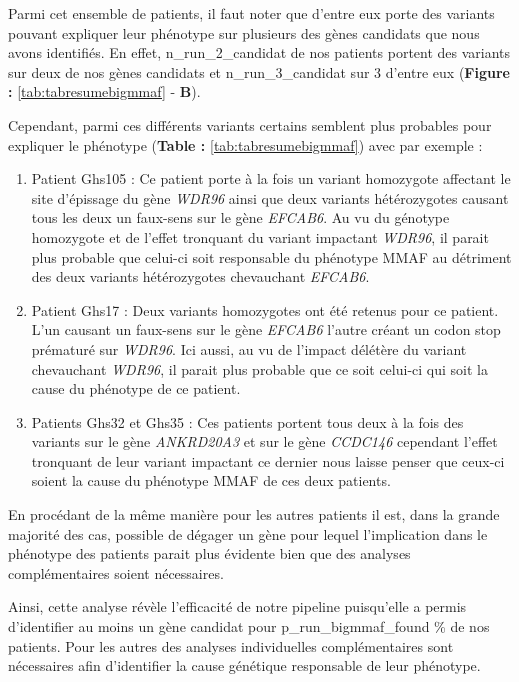 \documentclass[12pt,twoside]{reedthesis}
\providecommand{\tightlist}{%
  \setlength{\itemsep}{0pt}\setlength{\parskip}{0pt}}
\theoremstyle{definition}
\theoremstyle{definition}
\theoremstyle{remark}
\begin{document}
  Parmi cet ensemble de patients, il faut noter que d'entre eux porte des
  variants pouvant expliquer leur phénotype sur plusieurs des gènes
  candidats que nous avons identifiés. En effet, n\_run\_2\_candidat de
  nos patients portent des variants sur deux de nos gènes candidats et
  n\_run\_3\_candidat sur 3 d'entre eux (\textbf{Figure :
  }\ref{tab:tabresumebigmmaf} - \textbf{B}).
  
  Cependant, parmi ces différents variants certains semblent plus
  probables pour expliquer le phénotype (\textbf{Table :
  }\ref{tab:tabresumebigmmaf}) avec par exemple :
  
  \begin{enumerate}
  \def\labelenumi{\arabic{enumi}.}
  \tightlist
  \item
    Patient Ghs105 : Ce patient porte à la fois un variant homozygote
    affectant le site d'épissage du gène \emph{WDR96} ainsi que deux
    variants hétérozygotes causant tous les deux un faux-sens sur le gène
    \emph{EFCAB6}. Au vu du génotype homozygote et de l'effet tronquant du
    variant impactant \emph{WDR96}, il parait plus probable que celui-ci
    soit responsable du phénotype MMAF au détriment des deux variants
    hétérozygotes chevauchant \emph{EFCAB6}.\\
  \item
    Patient Ghs17 : Deux variants homozygotes ont été retenus pour ce
    patient. L'un causant un faux-sens sur le gène \emph{EFCAB6} l'autre
    créant un codon stop prématuré sur \emph{WDR96}. Ici aussi, au vu de
    l'impact délétère du variant chevauchant \emph{WDR96}, il parait plus
    probable que ce soit celui-ci qui soit la cause du phénotype de ce
    patient.\\
  \item
    Patients Ghs32 et Ghs35 : Ces patients portent tous deux à la fois des
    variants sur le gène \emph{ANKRD20A3} et sur le gène \emph{CCDC146}
    cependant l'effet tronquant de leur variant impactant ce dernier nous
    laisse penser que ceux-ci soient la cause du phénotype MMAF de ces
    deux patients.
  \end{enumerate}
  
  En procédant de la même manière pour les autres patients il est, dans la
  grande majorité des cas, possible de dégager un gène pour lequel
  l'implication dans le phénotype des patients parait plus évidente bien
  que des analyses complémentaires soient nécessaires.
  
  Ainsi, cette analyse révèle l'efficacité de notre pipeline puisqu'elle a
  permis d'identifier au moins un gène candidat pour
  p\_run\_bigmmaf\_found \% de nos patients. Pour les autres des analyses
  individuelles complémentaires sont nécessaires afin d'identifier la
  cause génétique responsable de leur phénotype.
  
\end{document}
